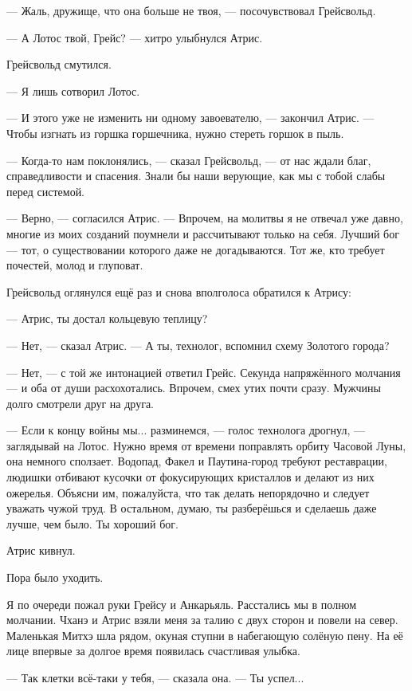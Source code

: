 --- Жаль, дружище, что она больше не твоя, --- посочувствовал Грейсвольд.

--- А Лотос твой, Грейс? --- хитро улыбнулся Атрис.

Грейсвольд смутился.

--- Я лишь сотворил Лотос.

--- И этого уже не изменить ни одному завоевателю, --- закончил Атрис.
--- Чтобы изгнать из горшка горшечника, нужно стереть горшок в пыль.

--- Когда-то нам поклонялись, --- сказал Грейсвольд, --- от нас ждали благ, справедливости и спасения.
Знали бы наши верующие, как мы с тобой слабы перед системой.

--- Верно, --- согласился Атрис.
--- Впрочем, на молитвы я не отвечал уже давно, многие из моих созданий поумнели и рассчитывают только на себя.
Лучший бог --- тот, о существовании которого даже не догадываются.
Тот же, кто требует почестей, молод и глуповат.

Грейсвольд оглянулся ещё раз и снова вполголоса обратился к Атрису:

--- Атрис, ты достал кольцевую теплицу?

--- Нет, --- сказал Атрис.
--- А ты, технолог, вспомнил схему Золотого города?

--- Нет, --- с той же интонацией ответил Грейс.
Секунда напряжённого молчания --- и оба от души расхохотались.
Впрочем, смех утих почти сразу.
Мужчины долго смотрели друг на друга.

--- Если к концу войны мы... разминемся, --- голос технолога дрогнул, --- заглядывай на Лотос.
Нужно время от времени поправлять орбиту Часовой Луны, она немного сползает.
Водопад, Факел и Паутина-город требуют реставрации, людишки отбивают кусочки от фокусирующих кристаллов и делают из них ожерелья.
Объясни им, пожалуйста, что так делать непорядочно и следует уважать чужой труд.
В остальном, думаю, ты разберёшься и сделаешь даже лучше, чем было.
Ты хороший бог.

Атрис кивнул.

Пора было уходить.

Я по очереди пожал руки Грейсу и Анкарьяль.
Расстались мы в полном молчании.
Чханэ и Атрис взяли меня за талию с двух сторон и повели на север.
Маленькая Митхэ шла рядом, окуная ступни в набегающую солёную пену.
На её лице впервые за долгое время появилась счастливая улыбка.

--- Так клетки всё-таки у тебя, --- сказала она.
--- Ты успел...

